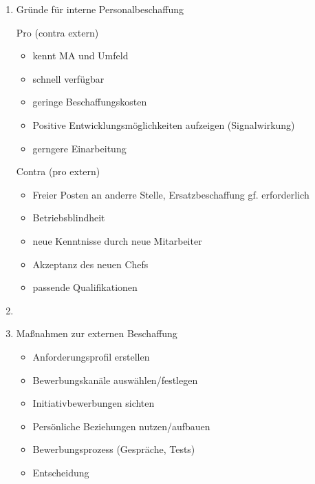 \documentclass[12pt,a4paper]{scrreprt}
\begin{document}
\begin{enumerate}

\item Gründe für interne Personalbeschaffung

Pro (contra extern)
\begin{itemize}
\item kennt MA und Umfeld
\item schnell verfügbar
\item geringe Beschaffungskosten
\item Positive Entwicklungsmöglichkeiten aufzeigen (Signalwirkung)
\item gerngere Einarbeitung
\end{itemize}

Contra (pro extern)
\begin{itemize}
\item Freier Posten an anderre Stelle, Ersatzbeschaffung gf. erforderlich
\item Betriebsblindheit
\item neue Kenntnisse durch neue Mitarbeiter
\item Akzeptanz des neuen Chefs
\item passende Qualifikationen
\end{itemize}

\item 

\item Maßnahmen zur externen Beschaffung

\begin{itemize}
\item Anforderungsprofil erstellen
\item Bewerbungskanäle auswählen/festlegen
\item Initiativbewerbungen sichten
\item Persönliche Beziehungen nutzen/aufbauen
\item Bewerbungsprozess (Gespräche, Tests)
\item Entscheidung
\end{itemize}

\end{enumerate}
\end{document}
